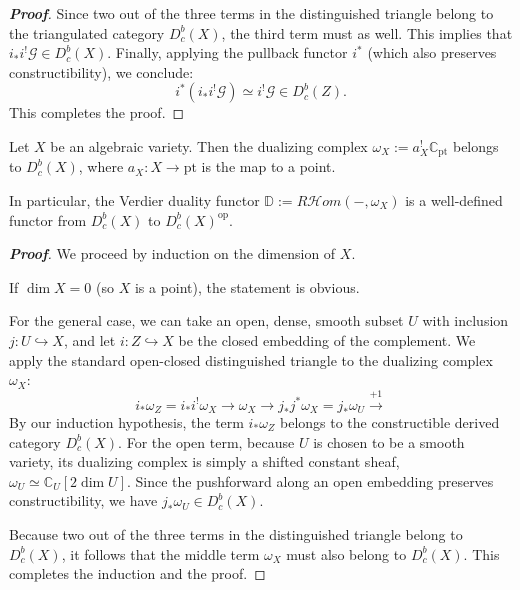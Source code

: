 \begin{proof}[\textbf{Proof}]
Since two out of the three terms in the distinguished triangle belong to the triangulated category $D^b_c(X)$, the third term must as well. This implies that $i_* i^! \mathcal{G} \in D^b_c(X)$. Finally, applying the pullback functor $i^*$ (which also preserves constructibility), we conclude:
\begin{equation*}
    i^* (i_* i^! \mathcal{G}) \simeq i^! \mathcal{G} \in D^b_c(Z).
\end{equation*}
This completes the proof.
\end{proof}


\begin{proposition}
Let $X$ be an algebraic variety. Then the dualizing complex $\omega_X := a_X^! \mathbb{C}_{\text{pt}}$ belongs to $D^b_c(X)$, where $a_X \colon X \longrightarrow \text{pt}$ is the map to a point.

In particular, the Verdier duality functor $\mathbb{D} := R\mathcal{H}om(-, \omega_X)$ is a well-defined functor from $D^b_c(X)$ to $D^b_c(X)^{\text{op}}$.
\end{proposition}

\begin{proof}[\textbf{Proof}]
We proceed by induction on the dimension of $X$. 

If $\dim X = 0$ (so $X$ is a point), the statement is obvious.

For the general case, we can take an open, dense, smooth subset $U$ with inclusion $j \colon U \hookrightarrow X$, and let $i \colon Z \hookrightarrow X$ be the closed embedding of the complement.
We apply the standard open-closed distinguished triangle to the dualizing complex $\omega_X$:
\begin{equation*}
    i_* \omega_Z = i_* i^! \omega_X \longrightarrow \omega_X \longrightarrow j_* j^* \omega_X = j_* \omega_U \xrightarrow{+1}
\end{equation*}
By our induction hypothesis, the term $i_* \omega_Z$ belongs to the constructible derived category $D^b_c(X)$. For the open term, because $U$ is chosen to be a smooth variety, its dualizing complex is simply a shifted constant sheaf, $\omega_U \simeq \mathbb{C}_U[2\dim U]$. Since the pushforward along an open embedding preserves constructibility, we have $j_* \omega_U \in D^b_c(X)$. 

Because two out of the three terms in the distinguished triangle belong to $D^b_c(X)$, it follows that the middle term $\omega_X$ must also belong to $D^b_c(X)$. This completes the induction and the proof.
\end{proof}


